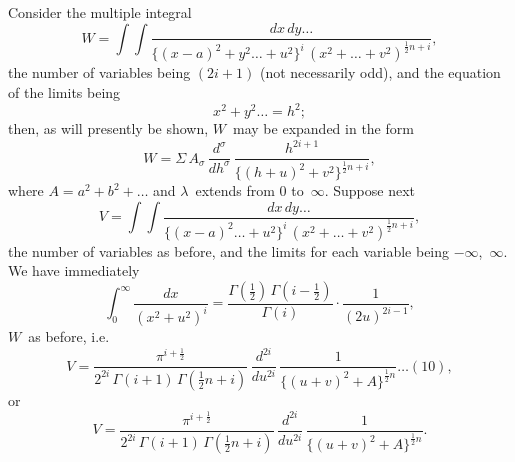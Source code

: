 \documentclass[11pt,a4paper]{book}
\begin{document}
Consider the multiple integral
\[
W = \int\!\!\int \frac{dx\,dy\ldots}{\{(x-a)^2 + y^2\ldots + u^2\}^i \, (x^2 + \ldots + v^2)^{\frac{1}{2}n+i}},
\]
the number of variables being $(2i+1)$ (not necessarily odd), and the equation of the limits being
\[
x^2 + y^2\ldots = h^2;
\]
then, as will presently be shown, $W$~may be expanded in the form
\[
W = \Sigma \, A_\sigma \, \frac{d^\sigma}{dh^\sigma} \, \frac{h^{2i+1}}{\{(h+u)^2 + v^2\}^{\frac{1}{2}n+i}},
\]
where $A = a^2 + b^2 + \ldots$ and $\lambda$~extends from $0$ to~$\infty$. Suppose next
\[
V = \int\!\!\int \frac{dx\,dy\ldots}{\{(x-a)^2\ldots + u^2\}^i \, (x^2 + \ldots + v^2)^{\frac{1}{2}n+i}},
\]
the number of variables as before, and the limits for each variable being $-\infty$,~$\infty$. We have immediately
\[
\int_0^\infty \frac{dx}{(x^2+u^2)^i} = \frac{\Gamma(\frac{1}{2})\,\Gamma(i-\frac{1}{2})}{\Gamma(i)} \cdot \frac{1}{(2u)^{2i-1}},
\]
$W$~as before, i.e.
\[
V = \frac{\pi^{i+\frac{1}{2}}}{2^{2i}\,\Gamma(i+1)\,\Gamma(\frac{1}{2}n+i)} \, \frac{d^{2i}}{du^{2i}} \, \frac{1}{\{(u+v)^2 + A\}^{\frac{1}{2}n}} \ldots(10),
\]
or
\[
V = \frac{\pi^{i+\frac{1}{2}}}{2^{2i}\,\Gamma(i+1)\,\Gamma(\frac{1}{2}n+i)} \, \frac{d^{2i}}{du^{2i}} \, \frac{1}{\{(u+v)^2 + A\}^{\frac{1}{2}n}}.
\]
\end{document}
